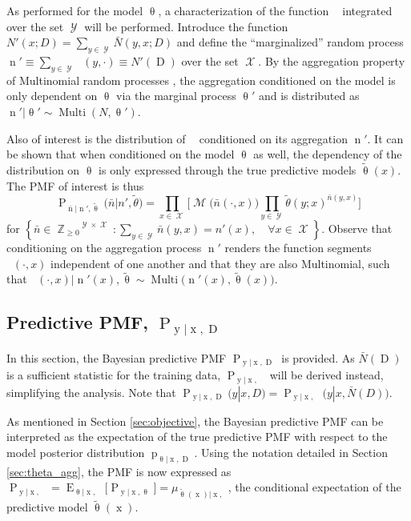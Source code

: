 \documentclass[conference]{IEEEtran}
\DeclareMathOperator{\xrm}{\mathrm{x}}
\DeclareMathOperator{\yrm}{\mathrm{y}}
\DeclareMathOperator{\Drm}{\mathrm{D}}
\DeclareMathOperator{\nrm}{\mathrm{n}}
\DeclareMathOperator{\nbarrm}{\bar{\mathrm{n}}}
\DeclareMathOperator{\Prm}{\mathrm{P}}
\DeclareMathOperator{\prm}{\mathrm{p}}
\DeclareMathOperator{\Erm}{\mathrm{E}}
\DeclareMathOperator{\Xcal}{\mathcal{X}}
\DeclareMathOperator{\Ycal}{\mathcal{Y}}
\DeclareMathOperator{\Mcal}{\mathcal{M}}
\DeclareMathOperator{\Zbb}{\mathbb{Z}}
\DeclareMathOperator{\Multi}{\mathrm{Multi}}
\begin{document}
As performed for the model $\uptheta$, a characterization of the function $\nbarrm$ integrated over the set $\Ycal$ will be performed. Introduce the function $N'(x;D) = \sum_{y \in \Ycal} \bar{N}(y,x;D)$ and define the ``marginalized'' random process $\nrm' \equiv \sum_{y \in \Ycal} \nbarrm(y,\cdot) \equiv N'(\Drm)$ over the set $\Xcal$. By the aggregation property of Multinomial random processes \cite{johnson}, the aggregation conditioned on the model is only dependent on $\uptheta$ via the marginal process $\uptheta'$ and is distributed as $\nrm' | \uptheta' \sim \Multi(N,\uptheta')$. 

Also of interest is the distribution of $\nbarrm$ conditioned on its aggregation $\nrm'$. It can be shown that when conditioned on the model $\uptheta$ as well, the dependency of the distribution on $\uptheta$ is only expressed through the true predictive models $\tilde{\uptheta}(x)$. The PMF of interest is thus
\begin{equation}
\Prm_{\bar{\nrm} | \nrm' , \tilde{\uptheta}}\big(\bar{n} | n' , \tilde{\theta}\big) = \prod_{x \in \Xcal} \Bigg[ \Mcal\big( \bar{n}(\cdot,x) \big) \prod_{y \in \Ycal} \tilde{\theta}(y;x)^{\bar{n}(y,x)} \Bigg] 
\end{equation}
for $\left\{ \bar{n} \in {\Zbb_{\geq 0}}^{\Ycal \times \Xcal} : \sum_{y \in \Ycal} \bar{n}(y,x) = n'(x), \quad \forall x \in \Xcal \right\}$. Observe that conditioning on the aggregation process $\nrm'$ renders the function segments $\nbarrm(\cdot,x)$ independent of one another and that they are also Multinomial, such that $\nbarrm(\cdot,x) | \nrm'(x),\tilde{\uptheta} \sim \Multi\big( \nrm'(x),\tilde{\uptheta}(x) \big)$.









\subsection{Predictive PMF, $\Prm_{\yrm | \xrm,\Drm}$}

In this section, the Bayesian predictive PMF $\Prm_{\yrm | \xrm,\Drm}$ is provided. As $\bar{N}(\Drm)$ is a sufficient statistic for the training data, $\Prm_{\yrm | \xrm,\nbarrm}$ will be derived instead, simplifying the analysis. Note that $\Prm_{\yrm | \xrm,\Drm}(y | x,D) = \Prm_{\yrm | \xrm,\nbarrm}\big( y | x,\bar{N}(D) \big)$.

As mentioned in Section \ref{sec:objective}, the Bayesian predictive PMF can be interpreted as the expectation of the true predictive PMF with respect to the model posterior distribution $\prm_{\uptheta | \xrm,\Drm}$. Using the notation detailed in Section \ref{sec:theta_agg}, the PMF is now expressed as $\Prm_{\yrm | \xrm,\nbarrm} = \Erm_{\uptheta | \xrm,\nbarrm}\big[ \Prm_{\yrm | \xrm,\uptheta} \big] = \mu_{\tilde{\uptheta}(\xrm) | \xrm,\nbarrm}$, the conditional expectation of the predictive model $\tilde{\uptheta}(\xrm)$.
\end{document}
